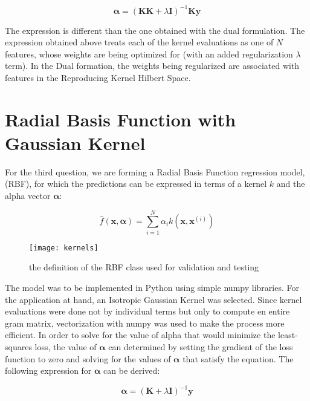 \documentclass{article}
\begin{document}
\begin{equation}
\boldsymbol\alpha = (\mathbf{KK} + \lambda \mathbf{I})^{-1}\mathbf{Ky}
\end{equation}

The expression is different than the one obtained with the dual formulation. The expression obtained above treats each of the kernel evaluations as one of $N$ features, whose weights are being optimized for (with an added regularization $\lambda$ term). In the Dual formation, the weights being regularized are associated with features in the Reproducing Kernel Hilbert Space.

\iftrue
\section{Radial Basis Function with Gaussian Kernel}
For the third question, we are forming a Radial Basis Function regression model, (RBF), for which the predictions can be expressed in terms of a kernel $k$ and the alpha vector $\boldsymbol\alpha$:

\begin{equation}
\hat{f}(\mathbf{x}, \boldsymbol\alpha) = \sum_{i=1}^{N} \alpha_i k(\mathbf{x}, \mathbf{x}^{(i)})
\end{equation}


\begin{figure}[H]
\centering
\texttt{[image: kernels]}
\caption{the definition of the RBF class used for validation and testing}
\end{figure}

The model was to be implemented in Python using simple numpy libraries. For the application at hand, an Isotropic Gaussian Kernel was selected. Since kernel evaluations were done not by individual terms but only to compute en entire gram matrix, vectorization with numpy was used to make the process more efficient. In order to solve for the value of alpha that would minimize the least-squares loss, the value of $\boldsymbol\alpha$ can determined by setting the gradient of the loss function to zero and solving for the values of $\boldsymbol\alpha$ that satisfy the equation. The following expression for $\boldsymbol\alpha$ can be derived:

\begin{equation}
\boldsymbol\alpha = (\mathbf{K} + \lambda \mathbf{I})^{-1} \mathbf{y}
\end{equation}
\end{document}
